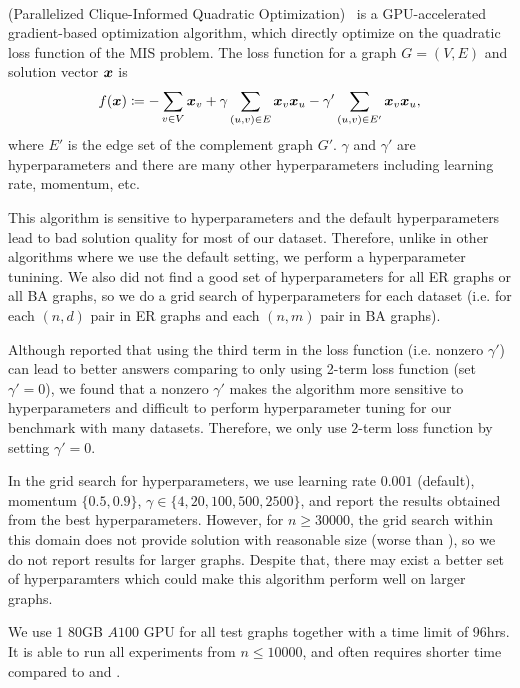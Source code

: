 \paragraph{\pcqo}
\pcqo(Parallelized
 Clique-Informed Quadratic Optimization)~\citep{alkhouri2024dataless} is a GPU-accelerated gradient-based optimization algorithm, which directly optimize on the quadratic loss function of the MIS problem. The loss function for a graph $G=(V,E)$ and solution vector ${\bm{x}}$ is \begin{equation}
    f({\bm{x}}) \coloneqq -\sum_{v\in V} {\bm{x}}_v + \gamma\sum_{(u,v)\in E} {\bm{x}}_v {\bm{x}}_u - \gamma' \sum_{(u,v)\in E'} {\bm{x}}_v {\bm{x}}_u,
\end{equation}
where $E'$ is the edge set of the complement graph $G'$. $\gamma$ and $\gamma'$ are hyperparameters and there are many other hyperparameters including learning rate, momentum, etc.

This algorithm is sensitive to hyperparameters and the default hyperparameters lead to bad solution quality for most of our dataset. Therefore, unlike in other algorithms where we use the default setting, we perform a hyperparameter tunining. We also did not find a good set of hyperparameters for all ER graphs or all BA graphs, so we do a grid search of hyperparameters for each dataset (i.e. for each $(n,d)$ pair in ER graphs and each $(n,m)$ pair in BA graphs).

Although \citet{alkhouri2024dataless} reported that using the third term in the loss function (i.e. nonzero $\gamma'$) can lead to better answers comparing to only using 2-term loss function (set $\gamma'=0$), we found that a nonzero $\gamma'$ makes the algorithm more sensitive to hyperparameters and difficult to perform hyperparameter tuning for our benchmark with many datasets. Therefore, we only use $2$-term loss function by setting $\gamma'=0$.

In the grid search for hyperparameters, we use learning rate $0.001$ (default), momentum $\{0.5, 0.9\}$, $\gamma \in \{4, 20, 100, 500, 2500\}$, and report the results obtained from the best hyperparameters. However, for $n \geq 30000$, the grid search within this domain does not provide solution with reasonable size (worse than \rangreedy), so we do not report results for larger graphs. Despite that, there may exist a better set of hyperparamters which could make this algorithm perform well on larger graphs.

We use 1 80GB $A100$ GPU for all test graphs together with a time limit of 96hrs. It is able to run all experiments from $n\leq 10000$, and often requires shorter time compared to \isco and \kamis.

